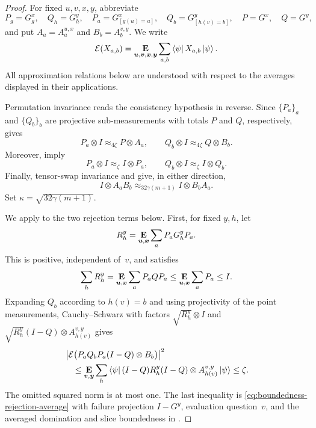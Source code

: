 \documentclass[11pt]{article}
\theoremstyle{definition}
\newcommand{\E}{\mathop{\bf E\/}}
\newcommand{\bu}{\boldsymbol{u}}
\newcommand{\bv}{\boldsymbol{v}}
\newcommand{\bx}{{\boldsymbol{x}}}
\newcommand{\by}{\boldsymbol{y}}
\begin{document}
\begin{proof}
For fixed $u,v,x,y$, abbreviate
\[
 P_g=G^x_g,\quad Q_h=G^y_h,\quad
 P_a=G^x_{[g(u)=a]},\quad Q_b=G^y_{[h(v)=b]},
 \quad P=G^x,\quad Q=G^y,
\]
and put $A_a=A^{u,x}_a$ and $B_b=A^{v,y}_b$.  We write
\[
 \mathcal E(X_{a,b})
 =\E_{\bu,\bv,\bx,\by}\sum_{a,b}
   \bra\psi X_{a,b}\ket\psi.
\]
All approximation relations below are understood with respect to the
averages displayed in their applications.

Permutation invariance reads the consistency hypothesis in reverse.
Since $\{P_a\}_a$ and $\{Q_b\}_b$ are projective
sub-measurements with totals $P$ and $Q$, respectively,
 gives
\begin{equation}\label{eq:evaluated-g-consistency-processed}
 P_a\otimes I\approx_{4\zeta}P\otimes A_a,
 \qquad
 Q_b\otimes I\approx_{4\zeta}Q\otimes B_b.
\end{equation}
Moreover,
 imply
\begin{equation}\label{eq:evaluated-g-self-consistency-processed}
 P_a\otimes I\approx_\zeta I\otimes P_a,
 \qquad
 Q_b\otimes I\approx_\zeta I\otimes Q_b.
\end{equation}
Finally, tensor-swap invariance and
 give, in either direction,
\begin{equation}\label{eq:evaluated-point-commutativity}
 I\otimes A_aB_b
 \approx_{32\gamma(m+1)}I\otimes B_bA_a.
\end{equation}
Set $\kappa=\sqrt{32\gamma(m+1)}$.

We apply  to the two rejection
terms below.  First, for fixed $y,h$, let
\[
 R_h^y=\E_{\bu,\bx}\sum_a P_aG_h^yP_a.
\]
This is positive, independent of~$v$, and satisfies
\[
 \sum_hR_h^y
 =\E_{\bu,\bx}\sum_aP_aQP_a
 \leq\E_{\bu,\bx}\sum_aP_a\leq I.
\]
Expanding $Q_b$ according to $h(v)=b$ and using projectivity of
the point measurements, Cauchy--Schwarz with
factors $\sqrt{R_h^y}\otimes I$ and
$\sqrt{R_h^y}(I-Q)\otimes A^{v,y}_{h(v)}$ gives
\begin{align}
&\left|\mathcal E\bigl(P_aQ_bP_a(I-Q)\otimes B_b\bigr)\right|^2\nonumber\\
&\quad\leq
 \E_{\bv,\by}\sum_h
   \bra\psi(I-Q)R_h^y(I-Q)\otimes A^{v,y}_{h(v)}\ket\psi
 \leq\zeta.\label{eq:evaluated-g-first-leakage}
\end{align}
The omitted squared norm is at most one.  The last inequality is
\eqref{eq:boundedness-rejection-average} with failure projection
$I-G^y$, evaluation question~$v$, and the averaged domination and
slice boundedness in .


\end{proof}
\end{document}
